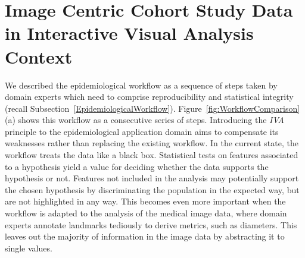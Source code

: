\documentclass[journal]{style/vgtc} 			          %
\begin{document}
\section{Image Centric Cohort Study Data in Interactive Visual Analysis Context} \label{Image Centric Cohort Study Data in Interactive Visual Analysis Context}
We described the epidemiological workflow as a sequence of steps taken by domain experts which need to comprise reproducibility and statistical integrity (recall Subsection~\ref{EpidemiologicalWorkflow}).
%
Figure~\ref{fig:WorkflowComparison} (a) shows this workflow as a consecutive series of steps.
%
Introducing the \emph{IVA} principle to the epidemiological application domain aims to compensate its weaknesses rather than replacing the existing workflow.
%
In the current state, the workflow treats the data like a black box.
%
Statistical tests on features associated to a hypothesis yield a value for deciding whether the data supports the hypothesis or not.
%
%
Features not included in the analysis may potentially support the chosen hypothesis by discriminating the population in the expected way, but are not highlighted in any way.
%
This becomes even more important when the workflow is adapted to the analysis of the medical image data, where
domain experts annotate landmarks tediously to derive metrics, such as diameters. %
%
This leaves out the majority of information in the image data by abstracting it to single values.
\end{document}
